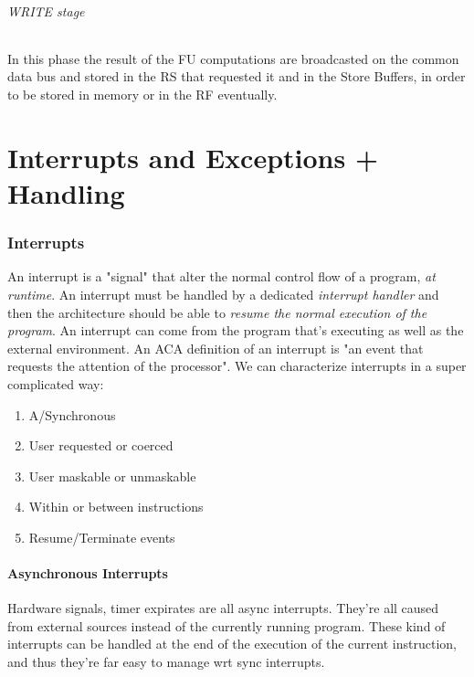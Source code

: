 \documentclass[10pt,a4paper]{article}
\begin{document}
					\paragraph{WRITE stage}
						In this phase the result of the FU computations are broadcasted on the common data bus and stored in the RS that requested it and in the Store Buffers, in order to be stored in memory or in the RF eventually.
						
	\clearpage \part{Interrupts and Exceptions + Handling}
		\section{Interrupts}
			An interrupt is a "signal" that alter the normal control flow of a program, \emph{at runtime}. An interrupt must be handled by a dedicated \emph{interrupt handler} and then the architecture should be able to \emph{resume the normal execution of the program}. An interrupt can come from the program that's executing as well as the external environment. An ACA definition of an interrupt is "an event that requests the attention of the processor". We can characterize interrupts in a super complicated way:
			\begin{enumerate}
				\item A/Synchronous
				\item User requested or coerced
				\item User maskable or unmaskable
				\item Within or between instructions
				\item Resume/Terminate events
			\end{enumerate}
			
			\subsection{Asynchronous Interrupts}
				Hardware signals, timer expirates are all async interrupts. They're all caused from external sources instead of the currently running program. These kind of interrupts can be handled at the end of the execution of the current instruction, and thus they're far easy to manage wrt sync interrupts.
				
\end{document}
